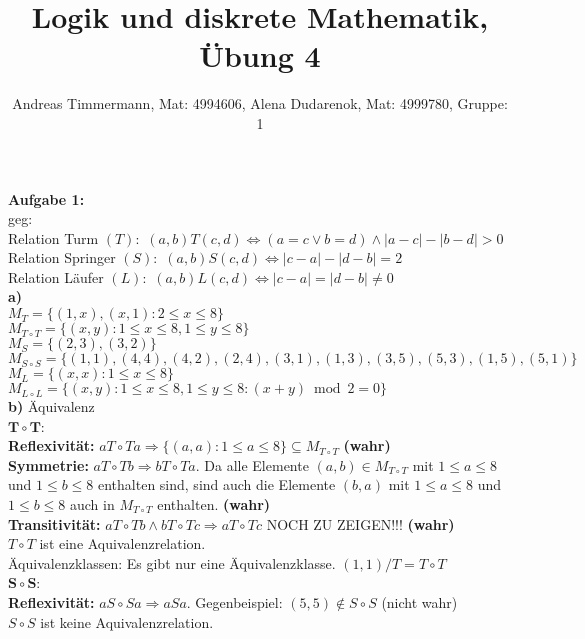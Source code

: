 \documentclass[a4paper]{scrartcl}
\title{Logik und diskrete Mathematik, Übung 4}
\author{Andreas Timmermann, Mat: 4994606, Alena Dudarenok, Mat: 4999780, Gruppe: 1}
\begin{document}
	\maketitle
	\begin{flushleft}
		\textbf{Aufgabe 1:}\\
		geg: \\
		Relation Turm $(T):$ $(a,b)T(c,d) \Leftrightarrow (a=c\vee b=d)\wedge |a-c|-|b-d|>0$\\
		Relation Springer $(S):$ $(a,b)S(c,d) \Leftrightarrow |c-a|-|d-b|=2$\\
		Relation Läufer $(L):$ $(a,b)L(c,d) \Leftrightarrow |c-a|=|d-b|\neq0$\\[1em]
		\textbf{a)}\\
		$M_T=\{(1,x),(x,1) : 2\leq x\leq 8\}$\\
		$M_{T\circ T}=\{(x,y): 1\leq x\leq 8,1\leq y\leq 8\}$\\
		$M_S=\{(2,3),(3,2)\}$\\
		$M_{S\circ S}=\{(1,1),(4,4),(4,2),(2,4),(3,1),(1,3),(3,5),(5,3),(1,5),(5,1)\}$\\
		$M_L=\{(x,x):1\leq x \leq 8\}$\\
		$M_{L\circ L}=\{(x,y): 1\leq x \leq 8,1\leq y \leq 8: (x+y) \bmod{2} = 0\}$\\[1em]
		\textbf{b)} Äquivalenz\\
		$\mathbf{T\circ T}$:\\
		\textbf{Reflexivität:} $aT\circ Ta\Rightarrow \{(a,a):1\leq a\leq 8\}\subseteq M_{T\circ T}$ \textbf{ (wahr)}\\
		\textbf{Symmetrie:} $aT\circ Tb\Rightarrow bT\circ Ta.$ Da alle Elemente $(a,b)\in M_{T\circ T}$ mit $1\leq a\leq 8$ und $1\leq b\leq 8$ enthalten sind, sind auch die Elemente $(b,a)$ mit $1\leq a\leq 8$ und $1\leq b\leq 8$ auch in $M_{T\circ T}$ enthalten.  \textbf{ (wahr)}\\
		\textbf{Transitivität:} $aT\circ Tb\wedge bT\circ Tc\Rightarrow aT\circ Tc$ NOCH ZU ZEIGEN!!! \textbf{ (wahr)}\\
		$T\circ T$ ist eine Aquivalenzrelation.\\
		Äquivalenzklassen: Es gibt nur eine Äquivalenzklasse. $(1,1)/T=T\circ T$\\[1em]
		$\mathbf{S\circ S}$:\\
		\textbf{Reflexivität:} $aS\circ Sa\Rightarrow aSa$. Gegenbeispiel: $(5,5)\notin S\circ S$  (nicht wahr)\\
		$S\circ S$ ist keine Aquivalenzrelation.\\[1em]

\end{flushleft}
\end{document}
